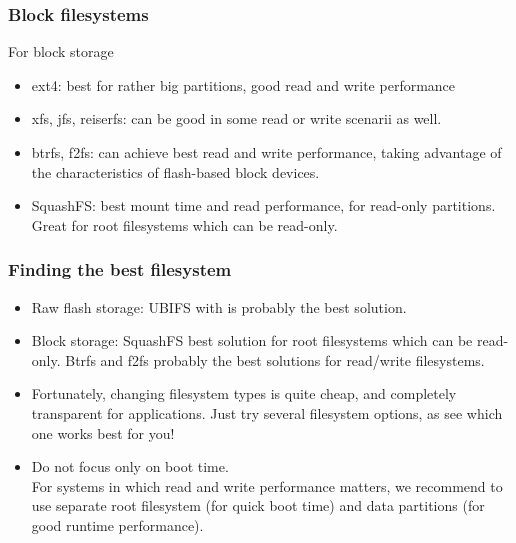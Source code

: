 \begin{frame}
\frametitle{Block filesystems}
For block storage
\begin{itemize}
\item ext4: best for rather big partitions, good read and write
      performance
\item xfs, jfs, reiserfs: can be good in some read or write scenarii
      as well.
\item btrfs, f2fs: can achieve best read and write performance,
      taking advantage of the characteristics of flash-based block
      devices.
\item SquashFS: best mount time and read performance, for read-only
      partitions. Great for root filesystems which can be read-only.
\end{itemize}
\end{frame}

\begin{frame}
\frametitle{Finding the best filesystem}
\begin{itemize}
\item Raw flash storage: UBIFS with  is
      probably the best solution.
\item Block storage: SquashFS best solution for root filesystems
      which can be read-only. Btrfs and f2fs probably the best solutions
      for read/write filesystems.
\item Fortunately, changing filesystem types is quite cheap,
      and completely transparent for applications. Just try 
      several filesystem options, as see which one works best 
      for you!
\item Do not focus only on boot time. \\
      For systems in which read and write performance matters, we 
      recommend to use separate root filesystem (for quick
      boot time) and data partitions (for good runtime performance). 
\end{itemize}
\end{frame}
